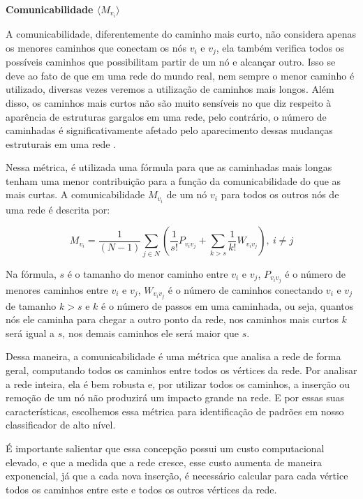 \documentclass[
12pt,        %
oneside,     %
a4paper,     %
english,       %
brazil        %
%
%
]{ppgca}
\begin{document}
\textbf{Comunicabilidade $\langle M_{v_i} \rangle$}

A comunicabilidade, diferentemente do caminho mais curto, não considera apenas os menores caminhos que conectam os nós $v_i$ e $v_j$, ela também verifica todos os possíveis caminhos que possibilitam partir de um nó e alcançar outro. Isso se deve ao fato de que em uma rede do mundo real, nem sempre o menor caminho é utilizado, diversas vezes veremos a utilização de caminhos mais longos. Além disso, os caminhos mais curtos não são muito sensíveis no que diz respeito à aparência de estruturas gargalos em uma rede, pelo contrário, o número de caminhadas é significativamente afetado pelo aparecimento dessas mudanças estruturais em uma rede \cite{Estrada2008}.

Nessa métrica, é utilizada uma fórmula para que as caminhadas mais longas tenham uma menor contribuição para a função da comunicabilidade do que as mais curtas. A comunicabilidade $M_{v_i}$ de um nó $v_i$ para todos os outros nós de uma rede é descrita por: 

\begin{equation}
        M_{v_i}=\frac{1}{(N-1)}\sum_{j \in N}\left(\frac{1}{s!}P_{v_iv_j}+\sum_{k>s}{\frac{1}{k!}W_{v_iv_j}}\right), \: i \neq j
\end{equation}   

Na fórmula, $s$ é o tamanho do menor caminho entre $v_i$ e $v_j$, $P_{v_iv_j}$ é o número de menores caminhos entre $v_i$ e $v_j$, $W_{v_iv_j}$ é o número de caminhos conectando $v_i$ e $v_j$ de tamanho $k>s$ e $k$ é o número de passos em uma caminhada, ou seja, quantos nós ele caminha para chegar a outro ponto da rede, nos caminhos mais curtos $k$ será igual a $s$, nos demais caminhos ele será maior que $s$.

Dessa maneira, a comunicabilidade é uma métrica que analisa a rede de forma geral, computando todos os caminhos entre todos os vértices da rede. Por analisar a rede inteira, ela é bem robusta e, por utilizar todos os caminhos, a inserção ou remoção de um nó não produzirá um impacto grande na rede. E por essas suas características, escolhemos essa métrica para identificação de padrões em nosso classificador de alto nível.

É importante salientar que essa concepção possui um custo computacional elevado, e que a medida que a rede cresce, esse custo aumenta de maneira exponencial, já que a cada nova inserção, é necessário calcular para cada vértice todos os caminhos entre este e todos os outros vértices da rede.
\end{document}
